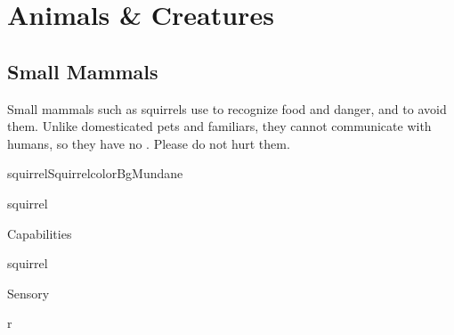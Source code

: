 \section{Animals \& Creatures}
\label{sec:animals}

\subsection{Small Mammals}


Small mammals such as squirrels use  to recognize food and danger,
and  to avoid them.
Unlike domesticated pets and familiars, they cannot communicate with
humans, so they have no .
Please do not hurt them.\\

\begin{actorCardMiniEuro}{squirrel}{Squirrel}{colorBgMundane}
	\begin{capabilitiesBox}{squirrel}
		\begin{capabilitiesTable}{Capabilities}
		\end{capabilitiesTable}
	\end{capabilitiesBox}

	\begin{speciesBonusBox}{squirrel}
		\begin{bonusTable}{Sensory}
		\end{bonusTable}
	\end{speciesBonusBox}
\end{actorCardMiniEuro}

\begin{wrapfigure}{r}{}
\end{wrapfigure}




